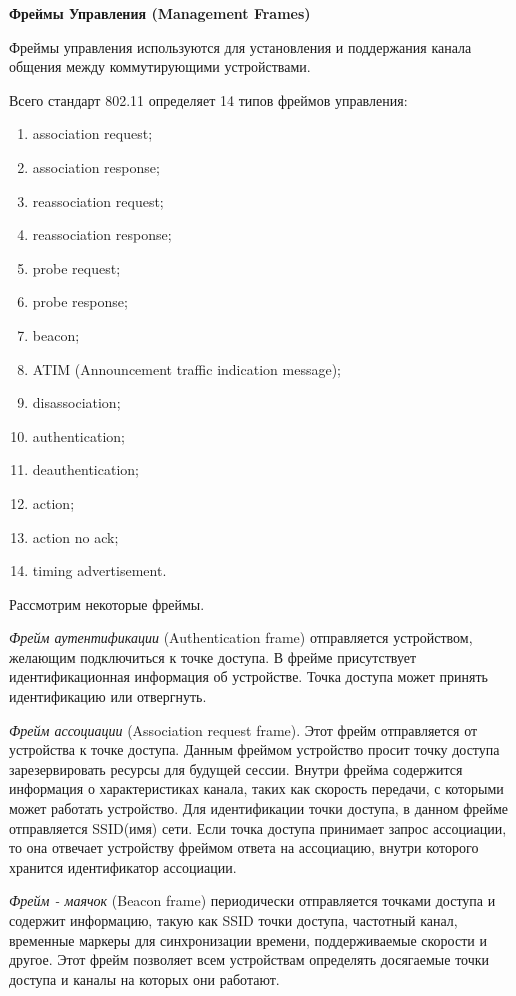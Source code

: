 \textbf{Фреймы Управления (Management Frames)}

Фреймы управления используются для установления и поддержания канала общения между коммутирующими устройствами.

Всего стандарт 802.11 определяет 14 типов фреймов управления:

\begin{enumerate}
	\item association request;
	\item association response;
	\item reassociation request;
	\item reassociation response;
	\item probe request;
	\item probe response;
	\item beacon;
	\item ATIM (Announcement traffic indication message);
	\item disassociation;
	\item authentication;
	\item deauthentication;
	\item action;
	\item action no ack;
	\item timing advertisement.
\end{enumerate}

Рассмотрим некоторые фреймы.

\textit{Фрейм аутентификации} (Authentication frame) отправляется устройством, желающим подключиться к точке доступа. В фрейме присутствует идентификационная информация об устройстве. Точка доступа может принять идентификацию или отвергнуть.

\textit{Фрейм ассоциации} (Association request frame). Этот фрейм отправляется от устройства к точке доступа. Данным фреймом устройство просит точку доступа зарезервировать ресурсы для будущей сессии. Внутри фрейма содержится информация о характеристиках канала, таких как скорость передачи, с которыми может работать устройство. Для идентификации точки доступа, в данном фрейме отправляется SSID(имя) сети. Если точка доступа принимает запрос ассоциации, то она отвечает устройству фреймом ответа на ассоциацию, внутри которого хранится идентификатор ассоциации.

\textit{Фрейм - маячок} (Beacon frame) периодически отправляется точками доступа и содержит информацию, такую как SSID точки доступа, частотный канал, временные маркеры для синхронизации времени, поддерживаемые скорости и другое. Этот фрейм позволяет всем устройствам определять досягаемые точки доступа и каналы на которых они работают.

